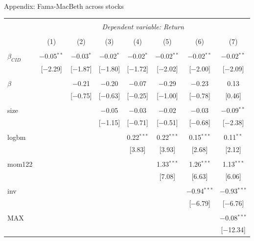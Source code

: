 \documentclass{beamer}
\begin{document}
\scriptsize
{\renewcommand{\arraystretch}{0.72}
\begin{frame}{Appendix: Fama-MacBeth across stocks}
\vspace{-0.38cm}
\begin{table}[!htbp] \centering 
\begin{tabular}{@{\extracolsep{0pt}}lccccccc} 
\\[-1.8ex]\hline 
\hline \\[-1.8ex] 
 & \multicolumn{7}{c}{\textit{Dependent variable: Return}} \\ 
\cline{2-8} 
\\[-1.8ex] & (1) & (2) & (3) & (4) & (5) & (6) & (7)\\ 
\hline \\[-1.8ex] 
 $\beta_{CID}$ & $-$0.05$^{**}$ & $-$0.03$^{*}$ & $-$0.02$^{*}$ & $-$0.02$^{*}$ & $-$0.02$^{**}$ & $-$0.02$^{**}$ & $-$0.02$^{**}$ \\ 
  & [$-$2.29] & [$-$1.87] & [$-$1.80] & [$-$1.72] & [$-$2.02] & [$-$2.00] & [$-$2.09] \\ 
  & & & & & & & \\ 
 $\beta$ &  & $-$0.21 & $-$0.20 & $-$0.07 & $-$0.29 & $-$0.23 & 0.13 \\ 
  &  & [$-$0.75] & [$-$0.63] & [$-$0.25] & [$-$1.00] & [$-$0.78] & [0.46] \\ 
  & & & & & & & \\ 
 size &  &  & $-$0.05 & $-$0.03 & $-$0.02 & $-$0.03 & $-$0.09$^{**}$ \\ 
  &  &  & [$-$1.15] & [$-$0.71] & [$-$0.51] & [$-$0.68] & [$-$2.38] \\ 
  & & & & & & & \\ 
 logbm &  &  &  & 0.22$^{***}$ & 0.22$^{***}$ & 0.15$^{***}$ & 0.11$^{**}$ \\ 
  &  &  &  & [3.83] & [3.93] & [2.68] & [2.12] \\ 
  & & & & & & & \\ 
 mom122 &  &  &  &  & 1.33$^{***}$ & 1.26$^{***}$ & 1.13$^{***}$ \\ 
  &  &  &  &  & [7.08] & [6.63] & [6.06] \\ 
  & & & & & & & \\ 
 inv &  &  &  &  &  & $-$0.94$^{***}$ & $-$0.93$^{***}$ \\ 
  &  &  &  &  &  & [$-$6.79] & [$-$6.76] \\ 
  & & & & & & & \\ 
 MAX &  &  &  &  &  &  & $-$0.08$^{***}$ \\ 
  &  &  &  &  &  &  & [$-$12.34] \\ 

\end{tabular}
\end{table}
\end{frame}}
\end{document}
